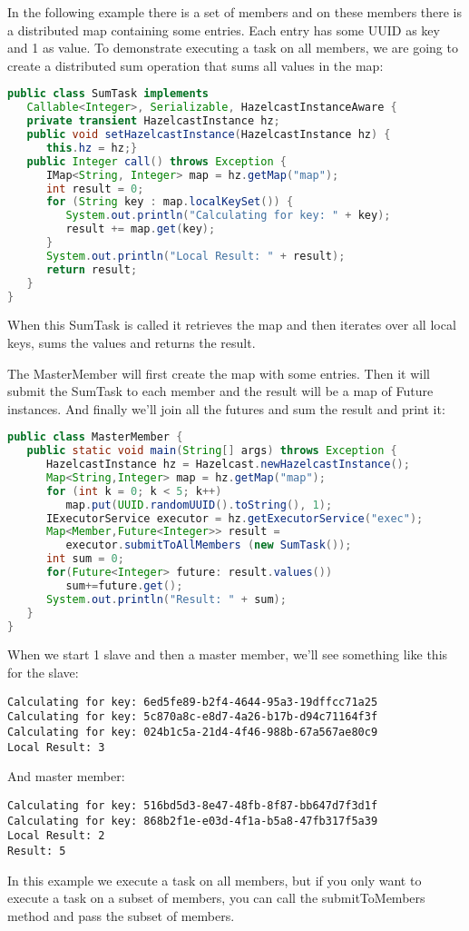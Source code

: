 In the following example there is a set of members and on these members there is a distributed map containing some entries. Each entry has some UUID as key and 1 as value. To demonstrate executing a task on all members, we are going to create a distributed sum operation that sums all values in the map:
\begin{lstlisting}[language=java]
public class SumTask implements
   Callable<Integer>, Serializable, HazelcastInstanceAware {
   private transient HazelcastInstance hz;
   public void setHazelcastInstance(HazelcastInstance hz) {
      this.hz = hz;}
   public Integer call() throws Exception {
      IMap<String, Integer> map = hz.getMap("map");
      int result = 0;
      for (String key : map.localKeySet()) {
         System.out.println("Calculating for key: " + key);
         result += map.get(key);
      }
      System.out.println("Local Result: " + result);
      return result;
   }
}
\end{lstlisting}
When this SumTask is called it retrieves the map and then iterates over all local keys, sums the values and returns the result.

The MasterMember will first create the map with some entries. Then it will submit the SumTask to each member and the result will be a map of Future instances. And finally we'll join all the futures and sum the result and print it:
\begin{lstlisting}[language=java]
public class MasterMember {
   public static void main(String[] args) throws Exception {
      HazelcastInstance hz = Hazelcast.newHazelcastInstance();
      Map<String,Integer> map = hz.getMap("map");
      for (int k = 0; k < 5; k++)
         map.put(UUID.randomUUID().toString(), 1);
      IExecutorService executor = hz.getExecutorService("exec");
      Map<Member,Future<Integer>> result = 
         executor.submitToAllMembers (new SumTask());
      int sum = 0;
      for(Future<Integer> future: result.values())
         sum+=future.get();
      System.out.println("Result: " + sum);
   }
}
\end{lstlisting}
When we start 1 slave and then a master member, we'll see something like this for the slave:
\begin{lstlisting}
Calculating for key: 6ed5fe89-b2f4-4644-95a3-19dffcc71a25
Calculating for key: 5c870a8c-e8d7-4a26-b17b-d94c71164f3f
Calculating for key: 024b1c5a-21d4-4f46-988b-67a567ae80c9
Local Result: 3
\end{lstlisting}
And master member:
\begin{lstlisting}
Calculating for key: 516bd5d3-8e47-48fb-8f87-bb647d7f3d1f
Calculating for key: 868b2f1e-e03d-4f1a-b5a8-47fb317f5a39
Local Result: 2
Result: 5
\end{lstlisting}
In this example we execute a task on all members, but if you only want to execute a task on a subset of members, you can call the submitToMembers method and pass the subset of members.

